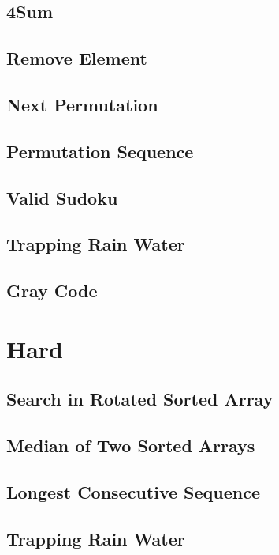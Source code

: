 \documentclass[12pt]{book}
\begin{document}
\subsection{4Sum}
\label{sec-1-2-7}
\subsection{Remove Element}
\label{sec-1-2-8}
\subsection{Next Permutation}
\label{sec-1-2-9}
\subsection{Permutation Sequence}
\label{sec-1-2-10}
\subsection{Valid Sudoku}
\label{sec-1-2-11}
\subsection{Trapping Rain Water}
\label{sec-1-2-12}
\subsection{Gray Code}
\label{sec-1-2-13}
\section{Hard}
\label{sec-1-3}
\subsection{Search in Rotated Sorted Array}
\label{sec-1-3-1}
\subsection{Median of Two Sorted Arrays}
\label{sec-1-3-2}
\subsection{Longest Consecutive Sequence}
\label{sec-1-3-3}
\subsection{Trapping Rain Water}
\label{sec-1-3-4}
\end{document}
